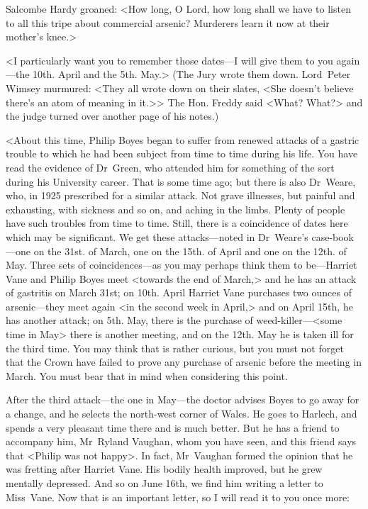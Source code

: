 Salcombe Hardy groaned: <How long, O Lord, how long shall we have to listen to all this tripe about commercial arsenic? Murderers learn it now at their mother's knee.>

<I particularly want you to remember those dates—I will give them to you again—the 10th. April and the 5th. May.> (The Jury wrote them down. Lord~Peter Wimsey murmured: <They all wrote down on their slates, <She doesn't believe there's an atom of meaning in it.>> The Hon. Freddy said <What? What?> and the judge turned over another page of his notes.)

<About this time, Philip Boyes began to suffer from renewed attacks of a gastric trouble to which he had been subject from time to time during his life. You have read the evidence of Dr~Green, who attended him for something of the sort during his University career. That is some time ago; but there is also Dr~Weare, who, in 1925 prescribed for a similar attack. Not grave illnesses, but painful and exhausting, with sickness and so on, and aching in the limbs. Plenty of people have such troubles from time to time. Still, there is a coincidence of dates here which may be significant. We get these attacks—noted in Dr~Weare's case-book—one on the 31st. of March, one on the 15th. of April and one on the 12th. of May. Three sets of coincidences—as you may perhaps think them to be—Harriet Vane and Philip Boyes meet <towards the end of March,> and he has an attack of gastritis on March 31st; on 10th. April Harriet Vane purchases two ounces of arsenic—they meet again <in the second week in April,> and on April 15th, he has another attack; on 5th. May, there is the purchase of weed-killer—<some time in May> there is another meeting, and on the 12th. May he is taken ill for the third time. You may think that is rather curious, but you must not forget that the Crown have failed to prove any purchase of arsenic before the meeting in March. You must bear that in mind when considering this point.

After the third attack—the one in May—the doctor advises Boyes to go away for a change, and he selects the north-west corner of Wales. He goes to Harlech, and spends a very pleasant time there and is much better. But he has a friend to accompany him, Mr~Ryland Vaughan, whom you have seen, and this friend says that <Philip was not happy>. In fact, Mr~Vaughan formed the opinion that he was fretting after Harriet Vane. His bodily health improved, but he grew mentally depressed. And so on June 16th, we find him writing a letter to Miss~Vane. Now that is an important letter, so I will read it to you once more:

